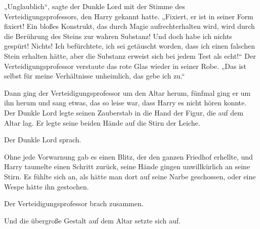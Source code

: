 „Unglaublich“, sagte der Dunkle Lord mit der Stimme des Verteidigungsprofessors, den Harry gekannt hatte.
„Fixiert, er ist in seiner Form fixiert! Ein bloßes Konstrukt, das durch Magie aufrechterhalten wird, wird durch die Berührung des Steins zur wahren Substanz! Und doch habe ich nichts gespürt! Nichts! Ich befürchtete, ich sei getäuscht worden, dass ich einen falschen Stein erhalten hätte, aber die Substanz erweist sich bei jedem Test als echt!“
Der Verteidigungsprofessor verstaute das rote Glas wieder in seiner Robe.
„Das ist selbst für meine Verhältnisse unheimlich, das gebe ich zu.“

Dann ging der Verteidigungsprofessor um den Altar herum, fünfmal ging er um ihn herum und sang etwas, das so leise war, dass Harry es nicht hören konnte.
Der Dunkle Lord legte seinen Zauberstab in die Hand der Figur, die auf dem Altar lag.
Er legte seine beiden Hände auf die Stirn der Leiche.

Der Dunkle Lord sprach. 

Ohne jede Vorwarnung gab es einen Blitz, der den ganzen Friedhof erhellte, und Harry taumelte einen Schritt zurück, seine Hände gingen unwillkürlich an seine Stirn. Es fühlte sich an, als hätte man dort auf seine Narbe geschossen, oder eine Wespe hätte ihn gestochen.

Der Verteidigungsprofessor brach zusammen.

Und die übergroße Gestalt auf dem Altar setzte sich auf.

